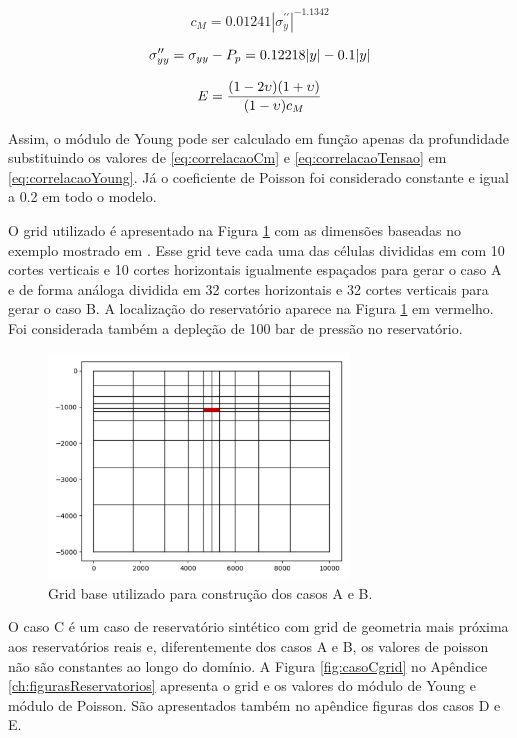 \begin{equation} \label{eq:correlacaoCm}
    c_M = 0.01241 |\sigma_y^{\prime\prime}|^{-1.1342}
\end{equation}

\begin{equation} \label{eq:correlacaoTensao}
\sigma^{\prime\prime}_{yy} = \sigma_{yy} - P_p = 0.12218|y| - 0.1 |y|
\end{equation}

\begin{equation} \label{eq:correlacaoYoung}
    E = \frac{(1-2\upsilon)(1+\upsilon)}{(1-\upsilon)c_M}
\end{equation}

Assim, o módulo de Young pode ser calculado em função apenas da profundidade substituindo os valores de \eqref{eq:correlacaoCm} e \eqref{eq:correlacaoTensao} em \eqref{eq:correlacaoYoung}. Já o coeficiente de Poisson foi considerado constante e igual a 0.2 em todo o modelo. 


O grid utilizado é apresentado na Figura \ref{fig:gridBase10x10} com as dimensões baseadas no exemplo mostrado em \cite{casteletto}. Esse grid teve cada uma das células divididas em com 10 cortes verticais e 10 cortes horizontais igualmente espaçados para gerar o caso A e de forma análoga dividida em 32 cortes horizontais e 32 cortes verticais para gerar o caso B. A localização do reservatório aparece na Figura \ref{fig:gridBase10x10} em vermelho. Foi considerada também a depleção de 100 bar de pressão no reservatório.

\begin{figure}[!htbp]
    \centering
    \includegraphics[height=6cm]{chap08/figs/Reservoir10x10_grid.png}
    \caption{Grid base utilizado para construção dos casos A e B.}
    \label{fig:gridBase10x10}
\end{figure}


O caso C é um caso de reservatório sintético com grid de geometria mais próxima aos reservatórios reais e, diferentemente dos casos A e B, os valores de poisson não são constantes ao longo do domínio. A Figura \ref{fig:casoCgrid} no Apêndice \ref{ch:figurasReservatorios} apresenta o grid e os valores do módulo de Young e módulo de Poisson. São apresentados também no apêndice figuras dos casos D e E.


